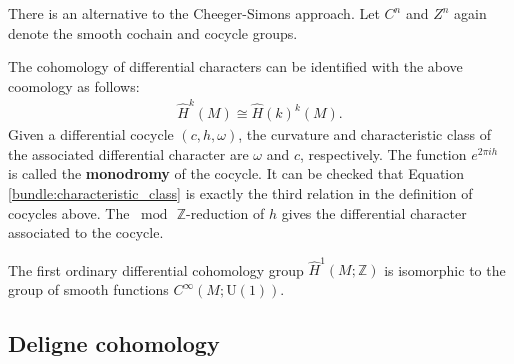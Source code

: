     There is an alternative to the Cheeger-Simons approach. Let $C^n$ and $Z^n$ again denote the smooth cochain and cocycle groups.
    \begin{property}
        The cohomology of differential characters can be identified with the above coomology as follows:
        \begin{gather}
            \hat{H}^k(M)\cong\hat{H}(k)^k(M).
        \end{gather}
        Given a differential cocycle $(c,h,\omega)$, the curvature and characteristic class of the associated differential character are $\omega$ and $c$, respectively. The function $e^{2\pi ih}$ is called the \textbf{monodromy} of the cocycle. It can be checked that Equation \eqref{bundle:characteristic_class} is exactly the third relation in the definition of cocycles above. The $\bmod\,\mathbb{Z}$-reduction of $h$ gives the differential character associated to the cocycle.
    \end{property}

    \begin{example}
        The first ordinary differential cohomology group $\hat{H}^1(M;\mathbb{Z})$ is isomorphic to the group of smooth functions $C^\infty(M;\mathrm{U}(1))$.
    \end{example}

\subsection{Deligne cohomology}

